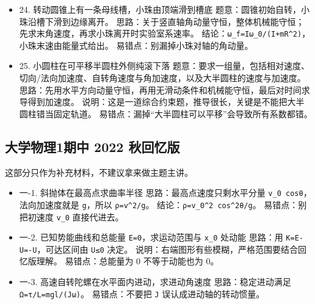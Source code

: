 \documentclass[12pt,a4paper]{ctexart}
\begin{document}
\begin{itemize}

\item 24. 转动圆锥上有一条母线槽，小珠由顶端滑到槽底 题意：圆锥初始自转，小珠沿槽下滑到边缘离开。 思路：关于竖直轴角动量守恒，整体机械能守恒；先求末角速度，再求小珠离开时实验室系速率。 结论：\texttt{ω\_f=Iω\_0/(I+mR\textasciicircum{}2)}，小珠末速由能量式给出。 易错点：别漏掉小珠对轴的角动量。

\end{itemize}

\begin{itemize}

\item 25. 小圆柱在可平移半圆柱外侧纯滚下落 题意：要求一组量，包括相对速度、切向/法向加速度、自转角速度与角加速度，以及大半圆柱的速度与加速度。 思路：先用水平方向动量守恒，再用无滑动条件和机械能守恒，最后对时间求导得到加速度。 说明：这是一道综合约束题，推导很长，关键是不能把大半圆柱错当固定轨道。 易错点：漏掉“大半圆柱可以平移”会导致所有系数都错。

\end{itemize}

\subsection{大学物理1期中 2022 秋回忆版}

这部分只作为补充材料，不建议拿来做主题主讲。

\begin{itemize}

\item 一-1. 斜抛体在最高点求曲率半径 思路：最高点速度只剩水平分量 \texttt{v\_0 cosθ}，法向加速度就是 \texttt{g}，所以 \texttt{ρ=v\textasciicircum{}2/g}。 结论：\texttt{ρ=v\_0\textasciicircum{}2 cos\textasciicircum{}2θ/g}。 易错点：别把初速度 \texttt{v\_0} 直接代进去。

\end{itemize}

\begin{itemize}

\item 一-2. 已知势能曲线和总能量 \texttt{E=0}，求运动范围与 \texttt{x\_0} 处动能 思路：用 \texttt{K=E-U=-U}，可达区间由 \texttt{U≤0} 决定。 说明：右端图形有些模糊，严格范围要结合回忆版理解。 易错点：总能量为 0 不等于动能也为 0。

\end{itemize}

\begin{itemize}

\item 一-3. 高速自转陀螺在水平面内进动，求进动角速度 思路：稳定进动满足 \texttt{Ω=τ/L=mgl/(Jω)}。 易错点：不要把 \texttt{J} 误认成进动轴的转动惯量。

\end{itemize}
\end{document}
